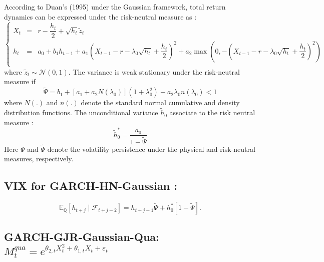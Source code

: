 \documentclass[preprint,times,12pt]{elsarticle}
\begin{document}
According to Duan's (1995) under the Gaussian framework, total return dynamics can be expressed under the risk-neutral measure as : 
 \begin{equation*}
\left\{
  \begin{array}{rcl}
X_{t}& = & r-\dfrac{h_{t}}{2}+\sqrt{h_{t}}\tilde{z}_{t}\\
h_{t}& = & a_{0}+b_{1}h_{t-1}+a_{1} \left(X_{t-1}-  r -\lambda_{0}\sqrt{h_{t}}+\dfrac{h_{t}}{2} \right)^{2}
+a_{2} \max\left( 0, - \left(X_{t-1}- r-\lambda_{0}\sqrt{h_{t}}+\dfrac{h_{t}}{2}  \right)^{2}\right) \\
  \end{array}
\right.
\end{equation*}
where $\tilde{z}_{t}\sim \mathcal{N}(0,1)$. The variance is weak stationary under the risk-neutral measure if  
\begin{equation*} 
\tilde{\Psi}= b_{1}+ \left[ a_{1}+a_{2} N(\lambda_{0})\right]\left(1+\lambda_{0}^{2} \right) +a_{2}\lambda_{0}n(\lambda_{0})<1
\end{equation*}
where $N(.)$ and $n(.)$ denote the standard normal cumulative and density distribution functions. The unconditional variance $\tilde{h}_{0}$ associate to the risk neutral measure :
\begin{equation*}
\tilde{h}_{0}^{*} =\dfrac{a_{0}}{1-\tilde{\Psi}}
\end{equation*}
Here $ \Psi $	and $ \tilde{\Psi} $ denote the volatility persistence under the physical and risk-neutral measures, respectively.

\subsection{VIX for  GARCH-HN-Gaussian :}
\begin{equation}
\mathbb{E}_\mathbb{Q}\left[ h_{t+j} \mid \mathcal{F}_{t+j-2}\right] =h_{t+j-1} \tilde{\Psi}  + h_{0}^{*}\left[1-\tilde{\Psi}\right].
\end{equation}





\subsection{ GARCH-GJR-Gaussian-Qua: $M^{qua}_{t}=e^{\theta_{2,t}X^{2}_{t}+\theta_{1,t}X_{t}+\varepsilon_{t}}$}
\end{document}
